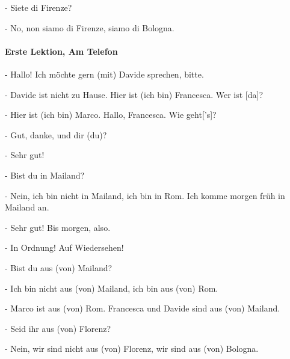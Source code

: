 \documentclass{article}
\begin{document}
- Siete di Firenze?

- No, non siamo di Firenze, siamo di Bologna.

\paragraph{Erste Lektion, Am Telefon}

- Hallo! Ich möchte gern (mit) Davide sprechen, bitte.

- Davide ist nicht zu Hause. Hier ist (ich bin) Francesca. Wer ist [da]?

- Hier ist (ich bin) Marco. Hallo, Francesca. Wie geht['s]?

- Gut, danke, und dir (du)?

- Sehr gut!

- Bist du in Mailand?

- Nein, ich bin nicht in Mailand, ich bin in Rom. Ich komme morgen früh in Mailand an.

- Sehr gut! Bis morgen, also.

- In Ordnung! Auf Wiedersehen!

- Bist du aus (von) Mailand?

- Ich bin nicht aus (von) Mailand, ich bin aus (von) Rom.

- Marco ist aus (von) Rom. Francesca und Davide sind aus (von) Mailand.

- Seid ihr aus (von) Florenz?

- Nein, wir sind nicht aus (von) Florenz, wir sind aus (von) Bologna.
\end{document}
